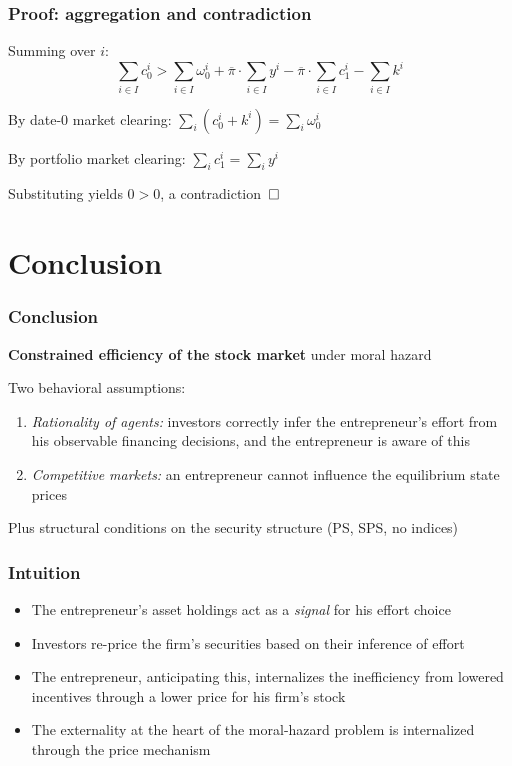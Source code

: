 \documentclass[blue]{beamer}
\def\boite{\hskip 0.5mm {\Box} \hskip 0.5mm}
\theoremstyle{definition}
\theoremstyle{example}
\begin{document}
\begin{frame}\frametitle{Proof: aggregation and contradiction}
Summing over $i$:
\begin{equation*}
\sum_{i \in I} c^i_0 > \sum_{i \in I} \omega^i_0 + \overline{\pi} \cdot \sum_{i \in I} y^i - \overline{\pi} \cdot \sum_{i \in I} c^i_1 - \sum_{i \in I} k^i
\end{equation*}
\bigskip

By date-$0$ market clearing: $\sum_i (c^i_0 + k^i) = \sum_i \omega^i_0$
\bigskip

By portfolio market clearing: $\sum_i c^i_1 = \sum_i y^i$
\bigskip

Substituting yields $0 > 0$, a contradiction $\boite$
\end{frame}

\section{Conclusion}

\begin{frame}\frametitle{Conclusion}
\textbf{Constrained efficiency of the stock market} under moral hazard
\bigskip

Two behavioral assumptions:
\begin{enumerate}
\item \emph{Rationality of agents:} investors correctly infer the entrepreneur's effort from his observable financing decisions, and the entrepreneur is aware of this
\item \emph{Competitive markets:} an entrepreneur cannot influence the equilibrium state prices
\end{enumerate}
\bigskip

Plus structural conditions on the security structure (PS, SPS, no indices)
\end{frame}

\begin{frame}\frametitle{Intuition}
\begin{itemize}
\item The entrepreneur's asset holdings act as a \emph{signal} for his effort choice
\bigskip
\item Investors re-price the firm's securities based on their inference of effort
\bigskip
\item The entrepreneur, anticipating this, internalizes the inefficiency from lowered incentives through a lower price for his firm's stock
\bigskip
\item The externality at the heart of the moral-hazard problem is internalized through the price mechanism
\end{itemize}
\end{frame}
\end{document}

